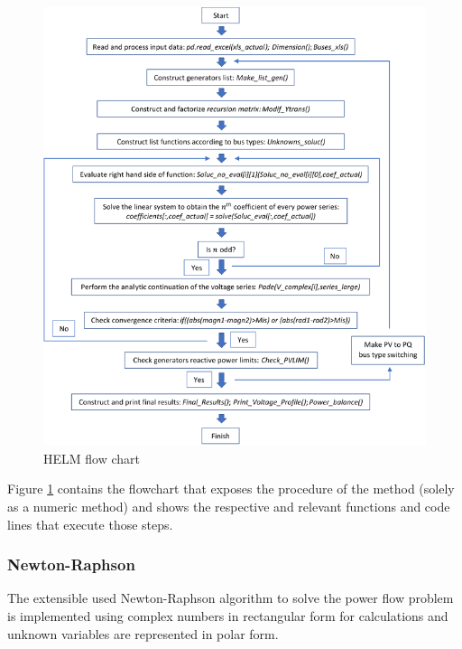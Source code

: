 \documentclass[12pt]{article}
\begin{document}
\begin{figure}[!h]
	\centering
	\includegraphics[width=\textwidth]{helmflowchart}
	\caption{HELM flow chart}
	\label{helmflowchart}
\end{figure}

Figure \ref{helmflowchart}  contains the flowchart that exposes the procedure of the method (solely as a numeric method) and shows the respective and relevant functions and code lines that execute those steps.

\subsubsection{Newton-Raphson}
The extensible used Newton-Raphson algorithm to solve the power flow problem is implemented using complex numbers in rectangular form for calculations and unknown variables are represented in polar form.
\end{document}
